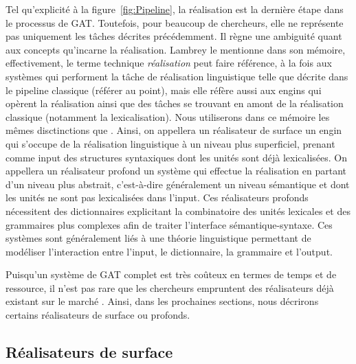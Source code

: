 Tel qu'explicité à la figure~\ref{fig:Pipeline}, la réalisation est la dernière étape dans le processus de \ac{GAT}. Toutefois, pour beaucoup de chercheurs, elle ne représente pas uniquement les tâches décrites précédemment. Il règne une ambiguité quant aux concepts qu'incarne la réalisation. Lambrey le mentionne \citep{LambreyImplementationcollocationspour2017} dans son mémoire, effectivement, le terme technique \emph{réalisation} peut faire référence, à la fois aux systèmes qui performent la tâche de réalisation linguistique telle que décrite dans le pipeline classique (référer au point), mais elle réfère aussi aux engins qui opèrent la réalisation ainsi que des tâches se trouvant en amont de la réalisation classique (notamment la lexicalisation). Nous utiliserons dans ce mémoire les mêmes disctinctions que \citep{LambreyImplementationcollocationspour2017}. Ainsi, on appellera un réalisateur de surface un engin qui s'occupe de la réalisation linguistique à un niveau plus superficiel, prenant comme input des structures syntaxiques dont les unités sont déjà lexicalisées. On appellera un réalisateur profond un système qui effectue la réalisation en partant d'un niveau plus abstrait, c'est-à-dire généralement un niveau sémantique et dont les unités ne sont pas lexicalisées dans l'input. Ces réalisateurs profonds nécessitent des dictionnaires explicitant la combinatoire des unités lexicales et des grammaires plus complexes afin de traiter l'interface sémantique-syntaxe. Ces systèmes sont généralement liés à une théorie linguistique permettant de modéliser l'interaction entre l'input, le dictionnaire, la grammaire et l'output.

Puisqu'un système de \ac{GAT} complet est très coûteux en termes de temps et de ressource, il n'est pas rare que les chercheurs empruntent des réalisateurs déjà existant sur le marché \citep{EssersChoosingSurfaceRealiser1998}. Ainsi, dans les prochaines sections, nous décrirons certains réalisateurs de surface ou profonds.



\subsection{Réalisateurs de surface}

